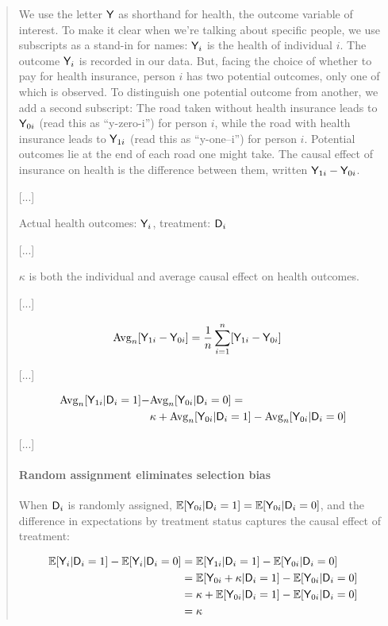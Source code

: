 \begin{quote}
We use the letter $\mathsf{Y}$ as shorthand for health, the outcome variable of interest. To make it clear when we’re talking about specific people, we use subscripts as a stand-in for names: $\mathsf{Y}_i$ is the health of individual $i$. The outcome $\mathsf{Y}_i$ is recorded in our data. But, facing the choice of whether to pay for health insurance, person $i$ has two potential  outcomes, only one of which is observed. To distinguish one potential outcome from another, we add a second subscript: The road taken without health insurance leads to $\mathsf{Y}_{0i}$ (read  this  as  “y-zero-i”)  for  person $i$,  while  the  road  with health insurance leads to $\mathsf{Y}_{1i}$ (read this as “y-one–i”) for person $i$. Potential outcomes lie at the end of each road one might take. The causal effect of insurance on health is the difference between them, written $\mathsf{Y}_{1i}-\mathsf{Y}_{0i}$.

[...]

Actual health outcomes: $\mathsf{Y}_i$, treatment: $\mathsf{D}_i$

[...]

$\kappa$ is both the individual and average causal effect on health outcomes.

[...]

\begin{align}
	\mathrm{Avg}_n[\mathsf{Y}_{1i}-\mathsf{Y}_{0i}] &= \frac{1}{n}\sum_{i=1}^n [\mathsf{Y}_{1i} - \mathsf{Y}_{0i}] \label{eq:cond_avg}
\end{align}

[...]

\begin{align}
	\mathrm{Avg}_n[\mathsf{Y}_{1i}|\mathsf{D}_i=1] - &\mathrm{Avg}_n[\mathsf{Y}_{0i}|\mathsf{D}_i=0] = \nonumber \\&\kappa + \mathrm{Avg}_n[\mathsf{Y}_{0i}|\mathsf{D}_i=1] - \mathrm{Avg}_n[\mathsf{Y}_{0i}|\mathsf{D}_i=0] \label{eq:angristeq14}
\end{align}

[...]

\paragraph{Random assignment eliminates selection bias} When $\mathsf{D}_i$ is randomly assigned, $\mathbb{E}[\mathsf{Y}_{0i}|\mathsf{D}_i = 1] = \mathbb{E}[\mathsf{Y}_{0i}|\mathsf{D}_i=0]$, and the difference in expectations by treatment status captures the causal effect of treatment:

\begin{align}
	\mathbb{E}[\mathsf{Y}_i|\mathsf{D}_i=1] - \mathbb{E}[\mathsf{Y}_i|\mathsf{D}_i=0] &= \mathbb{E}[\mathsf{Y}_{1i}|\mathsf{D}_i=1]-\mathbb{E}[\mathsf{Y}_{0i}|\mathsf{D}_i=0]\\
																	  &= \mathbb{E}[\mathsf{Y}_{0i}+\kappa|\mathsf{D}_i=1] - \mathbb{E}[\mathsf{Y}_{0i}|\mathsf{D}_i=0]\\
																	  &= \kappa + \mathbb{E}[\mathsf{Y}_{0i}|\mathsf{D}_i=1] - \mathbb{E}[\mathsf{Y}_{0i}|\mathsf{D}_i=0]\\
																	  &= \kappa \label{eq:no_you_cant}
\end{align}


\end{quote}
